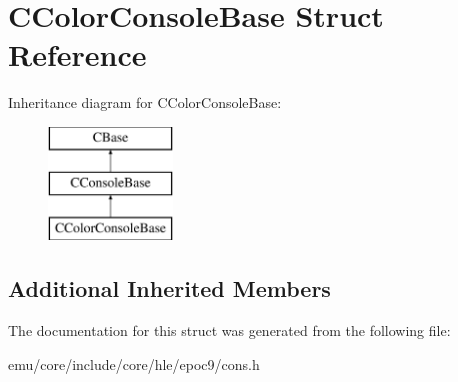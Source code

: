 \hypertarget{struct_c_color_console_base}{}\section{C\+Color\+Console\+Base Struct Reference}
\label{struct_c_color_console_base}
Inheritance diagram for C\+Color\+Console\+Base\+:\begin{figure}[H]
\begin{center}
\leavevmode
\includegraphics[height=3.000000cm]{struct_c_color_console_base}
\end{center}
\end{figure}
\subsection*{Additional Inherited Members}


The documentation for this struct was generated from the following file\+:\begin{DoxyCompactItemize}
\item 
emu/core/include/core/hle/epoc9/cons.\+h\end{DoxyCompactItemize}

